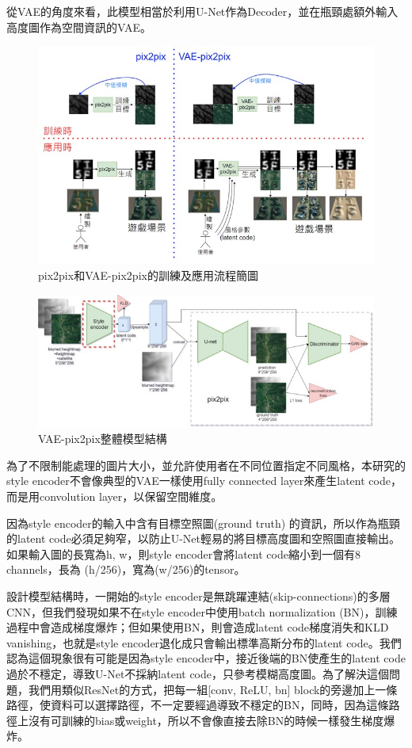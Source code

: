 \documentclass[a4paper, 12pt]{article}
\begin{document}
從VAE的角度來看，此模型相當於利用U-Net作為Decoder，並在瓶頸處額外輸入高度圖作為空間資訊的VAE。

\begin{figure}[htbp]
    \centering
    \includegraphics[width=\linewidth]{fig/6.jpg}
    \caption{pix2pix和VAE-pix2pix的訓練及應用流程簡圖}
    \label{fig:6}
\end{figure}

\begin{figure}[htbp]
    \centering
    \includegraphics[width=\linewidth]{fig/7.jpg}
    \caption{VAE-pix2pix整體模型結構}
    \label{fig:7}
\end{figure}


為了不限制能處理的圖片大小，並允許使用者在不同位置指定不同風格，本研究的style encoder不會像典型的VAE一樣使用fully connected layer來產生latent code，而是用convolution layer，以保留空間維度。

因為style encoder的輸入中含有目標空照圖(ground truth) 的資訊，所以作為瓶頸的latent code必須足夠窄，以防止U-Net輕易的將目標高度圖和空照圖直接輸出。如果輸入圖的長寬為h, w，則style encoder會將latent code縮小到一個有8 channels，長為 (h/256)，寬為(w/256)的tensor。

設計模型結構時，一開始的style encoder是無跳躍連結(skip-connections)的多層CNN，但我們發現如果不在style encoder中使用batch normalization (BN)，訓練過程中會造成梯度爆炸；但如果使用BN，則會造成latent code梯度消失和KLD vanishing，也就是style encoder退化成只會輸出標準高斯分布的latent code。我們認為這個現象很有可能是因為style encoder中，接近後端的BN使產生的latent code過於不穩定，導致U-Net不採納latent code，只參考模糊高度圖。為了解決這個問題，我們用類似ResNet的方式，把每一組[conv, ReLU, bn] block的旁邊加上一條路徑，使資料可以選擇路徑，不一定要經過導致不穩定的BN，同時，因為這條路徑上沒有可訓練的bias或weight，所以不會像直接去除BN的時候一樣發生梯度爆炸。
\end{document}
